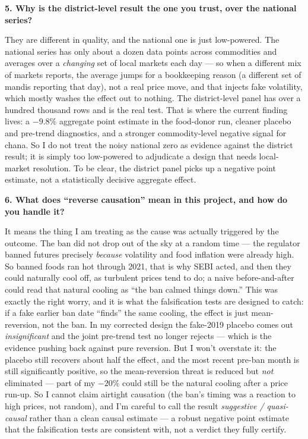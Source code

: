 \documentclass[11pt]{article}
\newcommand{\Q}[1]{\medskip\noindent\textbf{#1}\par}
\newcommand{\A}{\noindent}
\begin{document}
\Q{5. Why is the district-level result the one you trust, over the national series?}
\A They are different in quality, and the national one is just low-powered. The national series has
only about a dozen data points across commodities and averages over a \emph{changing} set of local
markets each day --- so when a different mix of markets reports, the average jumps for a bookkeeping
reason (a different set of mandis reporting that day), not a real price move, and that injects fake
volatility, which mostly washes the effect out to nothing. The district-level panel has over a
hundred thousand rows and is the real test. That is where the current finding lives: a $-9.8\%$
aggregate point estimate in the food-donor run, cleaner placebo and pre-trend diagnostics, and a
stronger commodity-level negative signal for chana. So I do not treat the noisy national zero as
evidence against the district result; it is simply too low-powered to adjudicate a design that needs
local-market resolution. To be clear, the district panel picks up a negative point estimate, not a
statistically decisive aggregate effect.

\Q{6. What does ``reverse causation'' mean in this project, and how do you handle it?}
\A It means the thing I am treating as the cause was actually triggered by the outcome. The ban did
not drop out of the sky at a random time --- the regulator banned futures precisely \emph{because}
volatility and food inflation were already high. So banned foods ran hot through 2021, that is why
SEBI acted, and then they could naturally cool off, as turbulent prices tend to do; a naive
before-and-after could read that natural cooling as ``the ban calmed things down.'' This was exactly
the right worry, and it is what the falsification tests are designed to catch: if a fake earlier ban
date ``finds'' the same cooling, the effect is just mean-reversion, not the ban. In my corrected
design the fake-2019 placebo comes out \emph{insignificant} and the joint pre-trend test no longer
rejects --- which is the evidence pushing back against pure reversion. But I won't overstate it: the
placebo still recovers about half the effect, and the most recent pre-ban month is still
significantly positive, so the mean-reversion threat is reduced but \emph{not} eliminated --- part of
my $-20\%$ could still be the natural cooling after a price run-up. So I cannot claim airtight
causation (the ban's timing was a reaction to high prices, not random), and I'm careful to call the
result \emph{suggestive / quasi-causal} rather than a clean causal estimate --- a robust negative
point estimate that the falsification tests are consistent with, not a verdict they fully certify.
\end{document}
